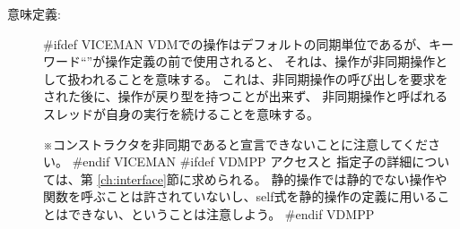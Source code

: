 \documentclass[\pformat,12pt]{jarticle}
\begin{document}
\begin{description}










\item[意味定義:]
#ifdef VICEMAN
VDMでの操作はデフォルトの同期単位であるが、キーワード``''が操作定義の前で使用されると、
それは、操作が非同期操作として扱われることを意味する。
これは、非同期操作の呼び出しを要求をされた後に、操作が戻り型を持つことが出来ず、
非同期操作と呼ばれるスレッドが自身の実行を続けることを意味する。

※コンストラクタを非同期であると宣言できないことに注意してください。
#endif VICEMAN
#ifdef VDMPP
アクセスと  指定子の詳細については、第 \ref{ch:interface}節に求められる。
静的操作では静的でない操作や関数を呼ぶことは許されていないし、self式を静的操作の定義に用いることはできない、ということは注意しよう。
#endif VDMPP


\end{description}
\end{document}
